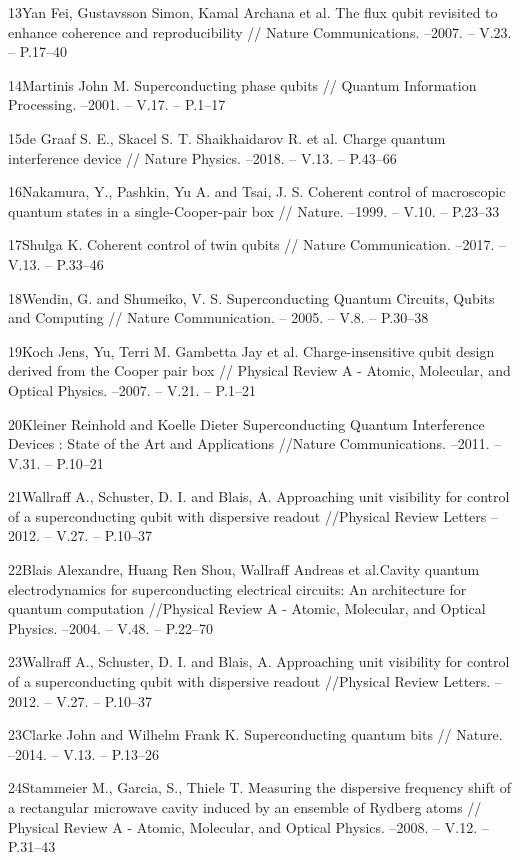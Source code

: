 	13\quad Yan Fei, Gustavsson Simon, Kamal Archana et al. The flux qubit revisited to enhance coherence and reproducibility // Nature Communications. --2007. -- V.23. -- P.17--40
	
	14\quad Martinis John M. Superconducting phase qubits // Quantum Information Processing. --2001. -- V.17. -- P.1--17
	
	15\quad de Graaf S. E., Skacel S. T. Shaikhaidarov R. et al. Charge quantum interference device // Nature Physics. --2018. -- V.13. -- P.43--66
	
	16\quad Nakamura, Y., Pashkin, Yu A. and Tsai, J. S. Coherent control of macroscopic quantum states in a single-Cooper-pair box // Nature. --1999. -- V.10. -- P.23--33
	
	17\quad Shulga K. Coherent control of twin qubits // Nature Communication. --2017. -- V.13. -- P.33--46
	
	18\quad Wendin, G. and Shumeiko, V. S. Superconducting Quantum Circuits, Qubits and Computing // Nature Communication. -- 2005. -- V.8. -- P.30--38
	
	19\quad Koch Jens, Yu, Terri M. Gambetta Jay et al. Charge-insensitive qubit design derived from the Cooper pair box // Physical Review A - Atomic, Molecular, and Optical Physics. --2007. -- V.21. -- P.1--21
	
	20\quad Kleiner Reinhold and Koelle Dieter Superconducting Quantum Interference Devices : State of the Art and Applications //Nature Communications. --2011. -- V.31. -- P.10--21
	
	21\quad Wallraff A., Schuster, D. I. and Blais, A.  Approaching unit visibility for control of a superconducting qubit with dispersive readout //Physical Review Letters --2012. -- V.27. -- P.10--37
	
	22\quad Blais Alexandre, Huang Ren Shou, Wallraff Andreas et al.Cavity quantum electrodynamics for superconducting electrical circuits: An architecture for quantum computation //Physical Review A - Atomic, Molecular, and Optical Physics. --2004. -- V.48. -- P.22--70
	
	23\quad Wallraff A., Schuster, D. I. and Blais, A.  Approaching unit visibility for control of a superconducting qubit with dispersive readout //Physical Review Letters. --2012. -- V.27. -- P.10--37
	
	23\quad Clarke John and Wilhelm Frank K. Superconducting quantum bits // Nature. --2014. -- V.13. -- P.13--26
	
	24\quad Stammeier M., Garcia, S., Thiele T. Measuring the dispersive frequency shift of a rectangular microwave cavity induced by an ensemble of Rydberg atoms // Physical Review A - Atomic, Molecular, and Optical Physics. --2008. -- V.12. -- P.31--43
	
